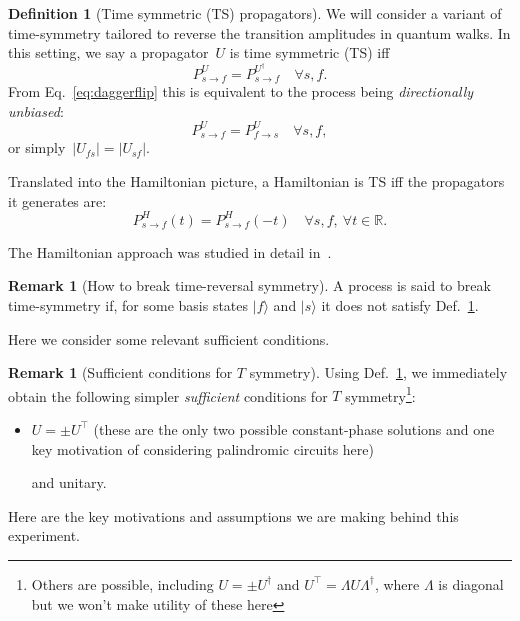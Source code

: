 \documentclass[aps,pra,12pt,nofootinbib,superscriptaddress,longbibliography,showpacs]{revtex4-1}
\theoremstyle{plain}
\theoremstyle{definition}
\newtheorem{definition}[theorem]{Definition}
\newtheorem{remark}[theorem]{Remark}
\newcommand{\ket}[1]{\ensuremath{|#1\rangle}}
\newcommand{\R}{{\mathbb R}}  %
\newcommand{\be}{\begin{equation}}
\newcommand{\ee}{\end{equation}}
\begin{document}
\begin{definition}[Time symmetric (TS) propagators] \label{def:time-symmetry} 
We will consider a variant of time-symmetry tailored to reverse the
transition amplitudes in quantum walks.  In this setting, we say a
propagator~$U$ is time symmetric (TS) iff
\be
\label{eq:ts}
P^U_{s\to f} = P^{U^\dagger}_{s\to f} \quad \forall s, f.
\ee
From Eq.~\eqref{eq:daggerflip} this 
is equivalent to the process being \emph{directionally unbiased}:
\be
\label{eq:du}
P^U_{s\to f} = P^{U}_{f\to s} \quad \forall s, f,
\ee
or simply~$|U_{fs}| = |U_{sf}|$.

Translated into the Hamiltonian picture, a Hamiltonian is TS iff
the propagators it generates are: 
\be
P^H_{s\to f}(t) = P^H_{s\to f}(-t) \quad \forall s, f,  \: \forall t \in \R.
\ee

The Hamiltonian approach was studied in detail in~\cite{Z12}. 
\end{definition} 

\begin{remark}[How to break time-reversal symmetry] 
 A process is said to break time-symmetry if, for some basis states $\ket{f}$
and $\ket{s}$ it does not satisfy Def.~\ref{def:time-symmetry}. 
\end{remark}

Here we consider some relevant sufficient conditions.  

\begin{remark}[Sufficient conditions for $T$ symmetry] 
\label{rmk:sufficient-t-sym}
Using Def.~\ref{def:time-symmetry}, we immediately obtain the following simpler
\emph{sufficient} conditions for $T$ symmetry\footnote{Others are possible,
including $U = \pm U^\dagger$ and $U^\top = \Lambda U \Lambda^\dagger$,
where $\Lambda$ is diagonal but we won't make utility of these here}:
\begin{itemize} 
\item $U = \pm U^\top$  (these are the only two possible constant-phase
solutions and one key motivation of considering palindromic circuits here)

  and unitary.
\end{itemize}
\end{remark}


Here are the key motivations and assumptions we are making behind this
experiment.  
\end{document}
